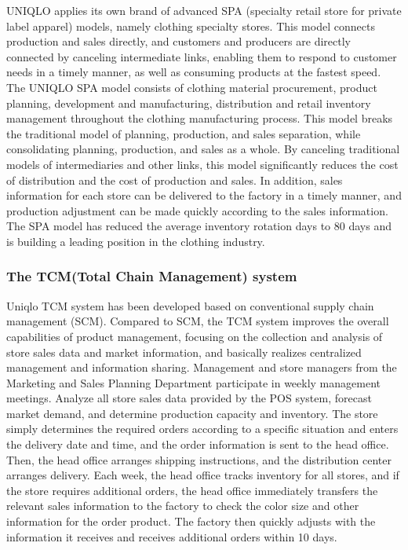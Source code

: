 \documentclass[12pt,]{article}
\begin{document}
UNIQLO applies its own brand of advanced SPA (specialty retail store for
private label apparel) models, namely clothing specialty stores. This
model connects production and sales directly, and customers and
producers are directly connected by canceling intermediate links,
enabling them to respond to customer needs in a timely manner, as well
as consuming products at the fastest speed. The UNIQLO SPA model
consists of clothing material procurement, product planning, development
and manufacturing, distribution and retail inventory management
throughout the clothing manufacturing process. This model breaks the
traditional model of planning, production, and sales separation, while
consolidating planning, production, and sales as a whole. By canceling
traditional models of intermediaries and other links, this model
significantly reduces the cost of distribution and the cost of
production and sales. In addition, sales information for each store can
be delivered to the factory in a timely manner, and production
adjustment can be made quickly according to the sales information. The
SPA model has reduced the average inventory rotation days to 80 days and
is building a leading position in the clothing industry.

\hypertarget{the-tcmtotal-chain-management-system}{%
\subsubsection{The TCM(Total Chain Management)
system}\label{the-tcmtotal-chain-management-system}}

Uniqlo TCM system has been developed based on conventional supply chain
management (SCM). Compared to SCM, the TCM system improves the overall
capabilities of product management, focusing on the collection and
analysis of store sales data and market information, and basically
realizes centralized management and information sharing. Management and
store managers from the Marketing and Sales Planning Department
participate in weekly management meetings. Analyze all store sales data
provided by the POS system, forecast market demand, and determine
production capacity and inventory. The store simply determines the
required orders according to a specific situation and enters the
delivery date and time, and the order information is sent to the head
office. Then, the head office arranges shipping instructions, and the
distribution center arranges delivery. Each week, the head office tracks
inventory for all stores, and if the store requires additional orders,
the head office immediately transfers the relevant sales information to
the factory to check the color size and other information for the order
product. The factory then quickly adjusts with the information it
receives and receives additional orders within 10 days.
\end{document}
